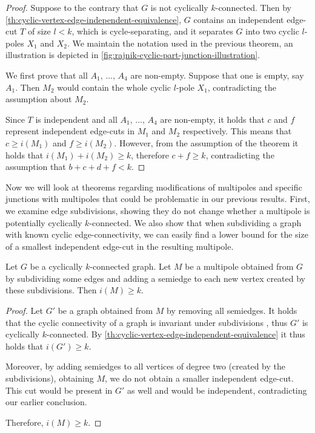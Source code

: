 \documentclass[12pt, twoside]{book}
\begin{document}
\begin{proof}
	Suppose to the contrary that $G$ is not cyclically $k$-connected. Then by \cref{th:cyclic-vertex-edge-independent-equivalence}, $G$ contains an independent edge-cut $T$ of size $l<k$, which is cycle-separating, and it separates $G$ into two cyclic $l$-poles $X_1$ and $X_2$. We maintain the notation used in the previous theorem, an illustration is depicted in \cref{fig:rajnik-cyclic-part-junction-illustration}.
	
	We first prove that all $A_1,\,\dots,\,A_4$ are non-empty. Suppose that one is empty, say $A_1$. Then $M_2$ would contain the whole cyclic $l$-pole $X_1$, contradicting the assumption about $M_2$.
	
	Since $T$ is independent and all $A_1,\,\dots,\,A_4$ are non-empty, it holds that $c$ and $f$ represent independent edge-cuts in $M_1$ and $M_2$ respectively. This means that ${c\geq i(M_1)}$ and ${f\geq i(M_2)}$. However, from the assumption of the theorem it holds that ${i(M_1)+i(M_2)\geq k}$, therefore ${c+f\geq k}$, contradicting the assumption that ${b+c+d+f<k}$.
\end{proof}

Now we will look at theorems regarding modifications of multipoles and specific junctions with multipoles that could be problematic in our previous results. First, we examine edge subdivisions, showing they do not change whether a multipole is potentially cyclically $k$-connected. We also show that when subdividing a graph with known cyclic edge-connectivity, we can easily find a lower bound for the size of a smallest independent edge-cut in the resulting multipole.

\begin{lemma}\label{lem:subdivisions-smallest-independent-cut}
	Let $G$ be a cyclically $k$-connected graph. Let $M$ be a multipole obtained from $G$ by subdividing some edges and adding a semiedge to each new vertex created by these subdivisions. Then $i(M)\geq k$.
\end{lemma}

\begin{proof}
	Let $G'$ be a graph obtained from $M$ by removing all semiedges. It holds that the cyclic connectivity of a graph is invariant under subdivisions \cite{atoms-of-cyclic}, thus $G'$ is cyclically $k$-connected. By \cref{th:cyclic-vertex-edge-independent-equivalence} it thus holds that $i(G')\geq k$.
	
	Moreover, by adding semiedges to all vertices of degree two (created by the subdivisions), obtaining $M$, we do not obtain a smaller independent edge-cut. This cut would be present in $G'$ as well and would be independent, contradicting our earlier conclusion.
	
	Therefore, $i(M)\geq k$.
\end{proof}
\end{document}
